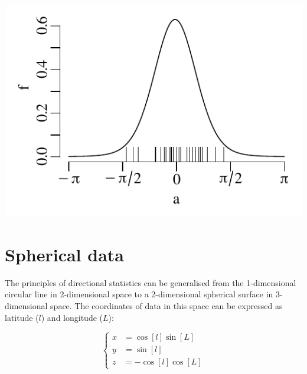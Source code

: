 \noindent\begin{minipage}[t][][b]{.4\textwidth}
\includegraphics[width=\textwidth]{../figures/kappastriations.pdf}\\
\end{minipage}
\begin{minipage}[t][][t]{.6\textwidth}
  \label{fig:kappastriations}
\end{minipage}

\section{Spherical data}
\label{sec:spherical-data}

The principles of directional statistics can be generalised from the
1-dimensional circular line in 2-dimensional space to a 2-dimensional
spherical surface in 3-dimensional space. The coordinates of data in
this space can be expressed as latitude ($l$) and longitude ($L$):

\begin{equation}
  \left\{
  \begin{split}
    x & = \cos[l]\sin[L]\\
    y & = \sin[l]\\
    z & = -\cos[l]\cos[L]
  \end{split}
  \right.
  \label{eq:lL}
\end{equation}

